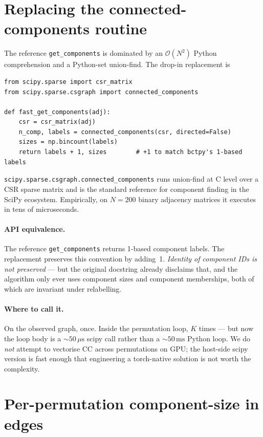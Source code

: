 \documentclass[11pt]{article}
\begin{document}
\section{Replacing the connected-components routine}

The reference \texttt{get\_components} is dominated by an $\mathcal{O}(N^2)$ Python comprehension and a Python-set union-find. The drop-in replacement is

\begin{lstlisting}
from scipy.sparse import csr_matrix
from scipy.sparse.csgraph import connected_components

def fast_get_components(adj):
    csr = csr_matrix(adj)
    n_comp, labels = connected_components(csr, directed=False)
    sizes = np.bincount(labels)
    return labels + 1, sizes        # +1 to match bctpy's 1-based labels
\end{lstlisting}

\texttt{scipy.sparse.csgraph.connected\_components} runs union-find at C level over a CSR sparse matrix and is the standard reference for component finding in the SciPy ecosystem. Empirically, on $N = 200$ binary adjacency matrices it executes in tens of microseconds.

\paragraph{API equivalence.} The reference \texttt{get\_components} returns 1-based component labels. The replacement preserves this convention by adding~1. \emph{Identity of component IDs is not preserved} --- but the original docstring already disclaims that, and the algorithm only ever uses component sizes and component memberships, both of which are invariant under relabelling.

\paragraph{Where to call it.} On the observed graph, once. Inside the permutation loop, $K$ times --- but now the loop body is a $\sim 50\,\mu\mathrm{s}$ scipy call rather than a $\sim 50\,\mathrm{ms}$ Python loop. We do \emph{not} attempt to vectorise CC across permutations on GPU; the host-side scipy version is fast enough that engineering a torch-native solution is not worth the complexity.

\section{Per-permutation component-size in edges}
\end{document}
